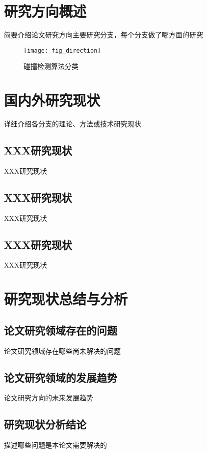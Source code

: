 \section{研究方向概述}
简要介绍论文研究方向主要研究分支，每个分支做了哪方面的研究


\begin{figure}[h]
	\centering
	\texttt{[image: fig\_direction]}
	\caption{碰撞检测算法分类}
\end{figure}

\section{国内外研究现状}
详细介绍各分支的理论、方法或技术研究现状

\subsection{XXX研究现状}
XXX研究现状
\subsection{XXX研究现状}
XXX研究现状
\subsection{XXX研究现状}
XXX研究现状
\section{研究现状总结与分析}
\subsection{论文研究领域存在的问题}
论文研究领域存在哪些尚未解决的问题   
\subsection{论文研究领域的发展趋势}
论文研究方向的未来发展趋势
\subsection{研究现状分析结论}
描述哪些问题是本论文需要解决的
